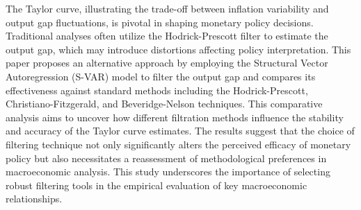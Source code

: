 
\begin{Abstrakt}
    The Taylor curve, illustrating the trade-off between inflation variability and output gap fluctuations, is pivotal in shaping monetary policy decisions. Traditional analyses often utilize the Hodrick-Prescott filter to estimate the output gap, which may introduce distortions affecting policy interpretation. This paper proposes an alternative approach by employing the Structural Vector Autoregression (S-VAR) model to filter the output gap and compares its effectiveness against standard methods including the Hodrick-Prescott, Christiano-Fitzgerald, and Beveridge-Nelson techniques. This comparative analysis aims to uncover how different filtration methods influence the stability and accuracy of the Taylor curve estimates. The results suggest that the choice of filtering technique not only significantly alters the perceived efficacy of monetary policy but also necessitates a reassessment of methodological preferences in macroeconomic analysis. This study underscores the importance of selecting robust filtering tools in the empirical evaluation of key macroeconomic relationships.
\end{Abstrakt}



\clearpage